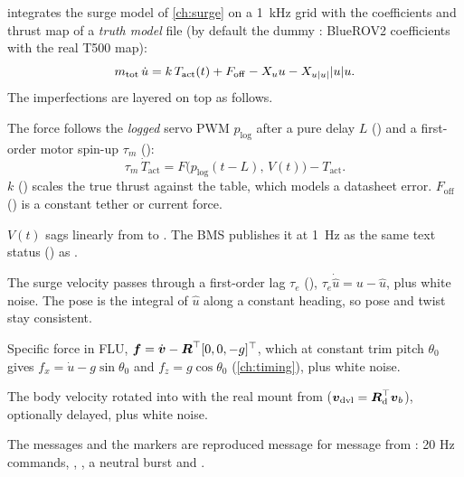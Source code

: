  integrates the surge model of \cref{ch:surge} on a \qty{1}{\kilo\hertz} grid
with the coefficients and thrust map of a \emph{truth model} file (by default the dummy
: BlueROV2 coefficients with the real T500 map):
\begin{equation}
  m_\mathrm{tot}\,\dot u = k\,T_\mathrm{act}(t) + F_\mathrm{off} - X_u u - X_{u|u|}|u|u .
  \label{eq:synth-plant}
\end{equation}
The imperfections are layered on top as follows.
\begin{description}[style=nextline]
  \item[Actuation] The force follows the \emph{logged} servo PWM $p_\mathrm{log}$ after a pure delay $L$
        () and a first-order motor spin-up $\tau_m$
        ():
        \begin{equation}
          \tau_m\,\dot T_\mathrm{act} = F\bigl(p_\mathrm{log}(t - L),\, V(t)\bigr) - T_\mathrm{act}.
        \end{equation}
        $k$ () scales the true thrust against the table, which models a
        datasheet error. $F_\mathrm{off}$ () is a constant tether or current force.
  \item[Battery] $V(t)$ sags linearly from  to . The BMS publishes it at
        \qty{1}{\hertz} as the same text status () as .
  \item[EKF] The surge velocity passes through a first-order lag $\tau_e$
        (), $\tau_e\dot{\hat u} = u - \hat u$, plus white noise. The pose is the
        integral of $\hat u$ along a constant heading, so pose and twist stay consistent.
  \item[IMU] Specific force in FLU, $\boldsymbol{f} = \dot{\boldsymbol{v}} - \boldsymbol{R}^\top[0,0,-g]^\top$, which at
        constant trim pitch $\theta_0$ gives $f_x = \dot u - g\sin\theta_0$ and
        $f_z = g\cos\theta_0$ (\cref{ch:timing}), plus white noise.
  \item[DVL] The body velocity rotated into  with the real mount from
         ($\boldsymbol{v}_\mathrm{dvl} = \boldsymbol{R}_\mathrm{d}^\top\boldsymbol{v}_b$), optionally
        delayed, plus white noise.
  \item[Scripts] The  messages and the 
        markers are reproduced message for message from : 20 Hz commands,
        , , a neutral burst and .
\end{description}

